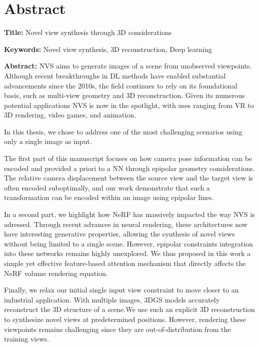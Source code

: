 \chapter{Abstract}

\begin{mdframed}[linecolor=Prune,linewidth=1]

    \textbf{Title:} Novel view synthesis through 3D considerations
    
    \noindent \textbf{Keywords:} Novel view synthesis, 3D reconstruction, Deep learning
    
    \begin{multicols}{2}
    \noindent \textbf{Abstract:}  \ac{NVS} aims to generate images of a scene from unobserved viewpoints. Although recent breakthroughs in \ac{DL} methods have enabled substantial advancements since the 2010s, the field continues to rely on its foundational basis, such as multi-view geometry and 3D reconstruction. Given its numerous potential applications \ac{NVS} is now in the spotlight, with uses ranging from \ac{VR} to 3D rendering, video games, and animation.

In this thesis, we chose to address one of the most challenging scenarios using only a single image as input.

The first part of this manuscript focuses on how camera pose information can be encoded and provided a priori to a \ac{NN} through epipolar geometry considerations. The relative camera displacement between the source view and the target view is often encoded suboptimally, and our work demonstrate that such a transformation can be encoded within an image using epipolar lines. 

In a second part, we highlight how \ac{NeRF} has massively impacted the way \ac{NVS} is adressed. Through recent advances in neural rendering, these architectures now have interesting generative properties, allowing the synthesis of novel views without being limited to a single scene. However, epipolar constraints integration into these networks remains highly unexplored. We thus proposed in this work a simple yet effective feature-based attention mechanism that directly affects the \ac{NeRF} volume rendering equation. 

Finally, we relax our initial single input view constraint to move closer to an industrial application. With multiple images, 3D\ac{GS} models accurately reconstruct the 3D structure of a scene.We use such an explicit 3D reconstruction to synthesize novel views at predetermined positions. However, rendering these viewpoints remains challenging since they are out-of-distribution from the training views.
\end{multicols}

\end{mdframed}
